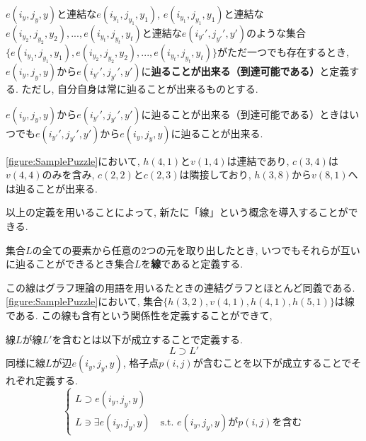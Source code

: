 \begin{definition}[到達可能]
  $e(i_y,j_y,y)$と連結な$e(i_{y_1},j_{y_1},y_1)$, $e(i_{y_1},j_{y_1},y_1)$と連結な$e(i_{y_2},j_{y_2},y_2),...,e(i_{y_t},j_{y_t},y_t)$と連結な$e(i_{y'}',j_{y'}',y')$のような集合\\
  $\{e(i_{y_1},j_{y_1},y_1),e(i_{y_2},j_{y_2},y_2),...,e(i_{y_t},j_{y_t},y_t)\}$がただ一つでも存在するとき, $e(i_y,j_y,y)$から$e(i_{y'}',j_{y'}',y')$に\textbf{辿ることが出来る（到達可能である）}と定義する. ただし, 自分自身は常に辿ることが出来るものとする.
\end{definition}

\begin{remark}
  $e(i_y,j_y,y)$から$e(i_{y'}',j_{y'}',y')$に辿ることが出来る（到達可能である）ときはいつでも$e(i_{y'}',j_{y'}',y')$から$e(i_y,j_y,y)$に辿ることが出来る.
\end{remark}

\begin{example}[連結, 含有, 隣接, 到達可能]
  \cref{figure:SamplePuzzle}において, $h(4,1)$と$v(1,4)$は連結であり, $c(3,4)$は$v(4,4)$のみを含み, $c(2,2)$と$c(2,3)$は隣接しており, $h(3,8)$から$v(8,1)$へは辿ることが出来る.
\end{example}
以上の定義を用いることによって, 新たに「線」という概念を導入することができる.

\begin{definition}[線]\label{definition:Line}
  集合$L$の全ての要素から任意の2つの元を取り出したとき, いつでもそれらが互いに辿ることができるとき集合$L$を\textbf{線}であると定義する.
\end{definition}
この線はグラフ理論の用語を用いるたときの連結グラフとほとんど同義である. \cref{figure:SamplePuzzle}において, 集合$\{h(3,2),v(4,1),h(4,1),h(5,1)\}$は線である. この線も含有という関係性を定義することができて,
\begin{definition}[線の含有]
  線$L$が線$L'$を含むとは以下が成立することで定義する.
  \begin{equation}
    L\supset L'
  \end{equation}
  同様に線$L$が辺$e(i_y,j_y,y)$, 格子点$p(i,j)$が含むことを以下が成立することでそれぞれ定義する.
  \begin{equation}
    \begin{cases}
      {L\supset  e(i_y,j_y,y) } \\
      {L\ni \exists e(i_y,j_y,y) \quad \mbox{s.t. $e(i_y,j_y,y)$が$p(i,j)$を含む}}
    \end{cases}
  \end{equation}
\end{definition}

